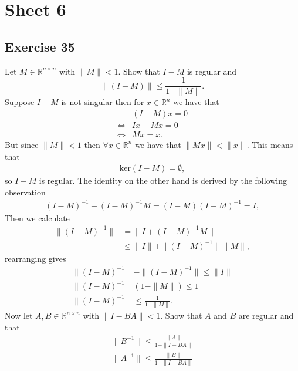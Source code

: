 


\maketitle
\tableofcontents
\section{Sheet 6}
\subsection{Exercise 35}
Let $M \in \mathbb{R}^{n \times  n}$ with $\|M\| < 1$. Show that $I - M$ is
regular and
\begin{equation}
    \|\left( I - M \right) \| \le \frac{1}{1-\|M\|}. \label{eq: ineq}
\end{equation}
Suppose $I-M$ is not singular then for $x \in \mathbb{R}^{n}$ we have that
\begin{align}
    &\left( I - M \right)x = 0\\
    \Leftrightarrow  &Ix - Mx = 0\\
    \Leftrightarrow & Mx = x.
\end{align}
But since $\|M\|<1$ then $\forall x \in \mathbb{R}^{n}$ we have that $\|Mx\|
< \|x\|$. This means that
\begin{align}
    \text{ker}\left(I-M \right) = \emptyset,
\end{align}
so $I-M$ is regular. The identity on the other hand is derived by the
following observation
\begin{align}
    \left( I-M \right)^{-1} - \left( I-M \right)^{-1} M = \left( I -M
    \right)\left( I-M \right)^{-1} = I,
\end{align}
Then we calculate
\begin{align}
    \|\left(I-M \right)^{-1}\|
    &= \|I+\left( I-M \right)^{-1} M\|\\
    &\le \|I\| + \|(I-M)^{-1}\|\|M\|,
\end{align}
rearranging gives
\begin{align}
    \|\left( I-M \right)^{-1}\| - \|(I-M)^{-1}\| \le \|I\|\\
    \|(I-M)^{-1}\|\left(1-\|M\|  \right)  \le 1\\
    \|\left( I-M \right)^{-1}\| \le \frac{1}{1-\|M\|}.
\end{align}
Now let $A,B \in \mathbb{R}^{n \times n}$ with  $\|I-BA\|<1$. Show that $A$
and $B$ are regular and that
\begin{align}
    \|B^{-1}\| \le \frac{\|A\|}{1-\|I-BA\|}\\
    \|A^{-1}\| \le \frac{\|B\|}{1-\|I-BA\|}\\
\end{align}
